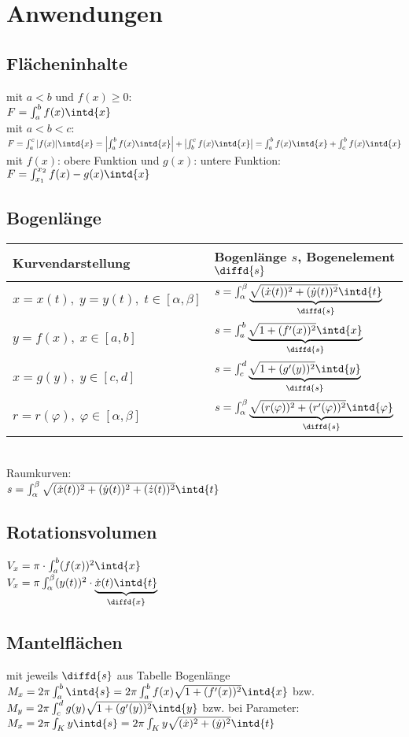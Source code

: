 \documentclass{scrreprt}
\begin{document}
\section{Anwendungen}
\subsection{Flächeninhalte}
mit $a<b$ und $f(x) \geq 0$:\\
$F=\int_a^b f(x) \intd{x}$\\
mit $a<b<c$:\\
$F=\int_a^c |f(x)| \intd{x}=\left| \int_a^b f(x) \intd{x}\right| + \left| \int_b^c f(x) \intd{x}\right|= \int_a^b f(x) \intd{x} + \int_c^b f(x) \intd{x}$\\
mit $f(x)$: obere Funktion und $g(x)$: untere Funktion:\\
$F=\int_{x_1}^{x_2} f(x) - g(x) \intd{x}$
\subsection{Bogenlänge}
\begin{tabular}{l | l}
Kurvendarstellung & Bogenlänge $s$, Bogenelement $\diffd{s}$\\ 
\hline
$x=x(t),\; y=y(t),\; t \in [\alpha,\beta]$ & $s= \int_{\alpha}^{\beta} \underbrace{\sqrt{(\dot{x}(t))^2+(\dot{y}(t))^2}\intd{t}}_{\diffd{s}}$\\
$y =f(x),\; x\in [a,b]$ & $s=\int_a^b\underbrace{\sqrt{1+(f'(x))^2}\intd{x}}_{\diffd{s}}$\\
$x= g(y), \; y \in [c,d] $ & $s=\int_c^d\underbrace{\sqrt{1+(g'(y))^2}\intd{y}}_{\diffd{s}}$\\
$r=r(\varphi), \; \varphi\in [\alpha, \beta]$ & $s=\int_{\alpha}^{\beta}\underbrace{\sqrt{(r(\varphi))^2+(r'(\varphi))^2}\intd{\varphi}}_{\diffd{s}}$
\end{tabular}\\
Raumkurven:\\
$s=\int_{\alpha}^{\beta} \sqrt{(\dot{x}(t))^2+(\dot{y}(t))^2+(\dot{z}(t))^2}\intd{t}$
\subsection{Rotationsvolumen}
$V_x = \pi \cdot \int_a^b(f(x))^2\intd{x}$\\
$V_x=\pi \int_{\alpha}^{\beta} (y(t))^2\cdot \underbrace{\dot{x}(t) \intd{t}}_{\diffd{x}}$
\subsection{Mantelflächen}
mit jeweils $\diffd{s}$ aus Tabelle Bogenlänge\\
$M_x=2\pi \int_a^b \intd{s}=2\pi \int_a^b f(x) \sqrt{1+(f'(x))^2}\intd{x}$ bzw.\\
$M_y=2\pi \int_c^d g(y) \sqrt{1+(g'(y))^2}\intd{y}$ bzw. bei Parameter:\\
$M_x=2\pi \int_K y\intd{s}=2\pi \int_K y \sqrt{(\dot{x})^2+(\dot{y}	)^2}\intd{t}$
\end{document}
